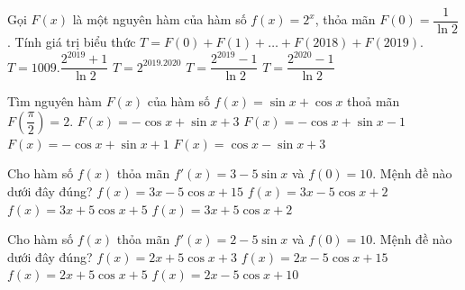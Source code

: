\begin{ex}
	Gọi $F(x)$ là một nguyên hàm của hàm số $f(x)=2^x$, thỏa mãn $F(0)=\dfrac{1}{\ln 2}$. Tính giá trị biểu thức $T=F(0)+F(1)+\ldots+F\left(2018\right)+F\left(2019\right)$.
	\choice
	{$T=1009.\dfrac{2^{2019}+1}{\ln 2}$}
	{$T=2^{2019.2020}$}
	{$T=\dfrac{2^{2019}-1}{\ln 2}$}
	{\True $T=\dfrac{2^{2020}-1}{\ln 2}$}
\end{ex}
\begin{ex}
	[Mã 104 2017]%
	Tìm nguyên hàm $ F(x)$ của hàm số $ f(x)=\sin x+\cos x$ thoả mãn $ F\left(\dfrac{\pi}{2}\right)=2$.
	\choice
	{$ F(x)=-\cos x+\sin x+3$}
	{$ F(x)=-\cos x+\sin x-1$}
	{\True $ F(x)=-\cos x+\sin x+1$}
	{$ F(x)=\cos x-\sin x+3$}
\end{ex}
\begin{ex}
	[Mã 123 2017]%
	Cho hàm số $ f(x)$ thỏa mãn $ f'(x)=3-5\sin x$ và $ f(0)=10$. Mệnh đề nào dưới đây đúng?
	\choice
	{$ f(x)=3x-5\cos x+15$}
	{$ f(x)=3x-5\cos x+2$}
	{\True $ f(x)=3x+5\cos x+5$}
	{$ f(x)=3x+5\cos x+2$}
\end{ex}
\begin{ex}
	Cho hàm số $f(x)$ thỏa mãn $f'(x)=2-5\sin x$ và $f(0)=10$. Mệnh đề nào dưới đây đúng?
	\choice
	{$ f(x)=2x+5\cos x+3$}
	{$ f(x)=2x-5\cos x+15$}
	{\True $ f(x)=2x+5\cos x+5$}
	{$ f(x)=2x-5\cos x+10$}
\end{ex}

